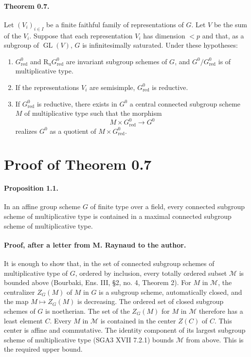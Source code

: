 \documentclass[11pt]{article}
\newcommand{\GL}{\operatorname{GL}}
\newcommand{\Ru}{\operatorname{R_u}}
\newcommand{\red}{\mathrm{red}}
\theoremstyle{plain}
\theoremstyle{definition}
\begin{document}
\paragraph{Theorem 0.7.} Let $(V_i)_{i\in I}$ be a finite faithful family of representations of $G$. Let $V$ be the sum of the $V_i$. Suppose that each representation $V_i$ has dimension $<p$ and that, as a subgroup of $\GL(V)$, $G$ is infinitesimally saturated. Under these hypotheses:
\begin{enumerate}[label=(\roman*)]
\item $G^0_{\red}$ and $\Ru G^0_{\red}$ are invariant subgroup schemes of $G$, and $G^0/G^0_{\red}$ is of multiplicative type.
\item If the representations $V_i$ are semisimple, $G^0_{\red}$ is reductive.
\item If $G^0_{\red}$ is reductive, there exists in $G^0$ a central connected subgroup scheme $M$ of multiplicative type such that the morphism
\[
   M\times G^0_{\red}\longrightarrow G^0
\]
realizes $G^0$ as a quotient of $M\times G^0_{\red}$.
\end{enumerate}

\section{Proof of Theorem 0.7}
\paragraph{Proposition 1.1.} In an affine group scheme $G$ of finite type over a field, every connected subgroup scheme of multiplicative type is contained in a maximal connected subgroup scheme of multiplicative type.

\paragraph{Proof, after a letter from M. Raynaud to the author.} It is enough to show that, in the set of connected subgroup schemes of multiplicative type of $G$, ordered by inclusion, every totally ordered subset $\mathcal M$ is bounded above (Bourbaki, Ens. III, \S2, no. 4, Theorem 2). For $M$ in $\mathcal M$, the centralizer $Z_G(M)$ of $M$ in $G$ is a subgroup scheme, automatically closed, and the map $M\mapsto Z_G(M)$ is decreasing. The ordered set of closed subgroup schemes of $G$ is noetherian. The set of the $Z_G(M)$ for $M$ in $\mathcal M$ therefore has a least element $C$. Every $M$ in $\mathcal M$ is contained in the center $Z(C)$ of $C$. This center is affine and commutative. The identity component of its largest subgroup scheme of multiplicative type (SGA3 XVII 7.2.1) bounds $\mathcal M$ from above. This is the required upper bound.
\end{document}
